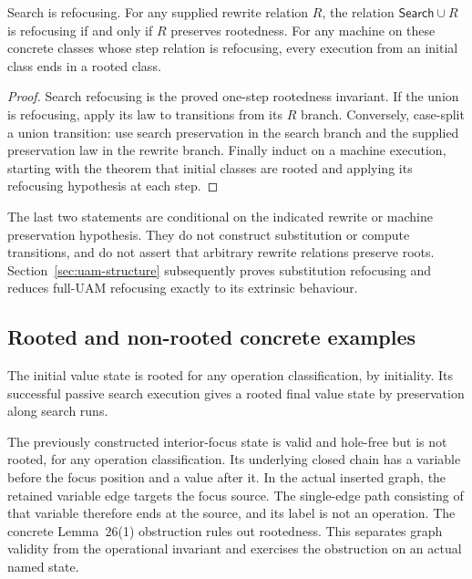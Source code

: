 \begin{theorem}
Search is refocusing. For any supplied rewrite relation $R$, the relation
$\mathsf{Search}\cup R$ is refocusing if and only if $R$ preserves rootedness.
For any machine on these concrete classes whose step relation is refocusing,
every execution from an initial class ends in a rooted class.
\end{theorem}
\begin{proof}
Search refocusing is the proved one-step rootedness invariant. If the union
is refocusing, apply its law to transitions from its $R$ branch. Conversely,
case-split a union transition: use search preservation in the search branch
and the supplied preservation law in the rewrite branch. Finally induct on
a machine execution, starting with the theorem that initial classes are rooted
and applying its refocusing hypothesis at each step.
\end{proof}
The last two statements are conditional on the indicated rewrite or machine
preservation hypothesis. They do not construct substitution or compute
transitions, and do not assert that arbitrary rewrite relations preserve roots.
Section~\ref{sec:uam-structure} subsequently proves substitution refocusing
and reduces full-UAM refocusing exactly to its extrinsic behaviour.

\subsection{Rooted and non-rooted concrete examples}
The initial value state is rooted for any operation classification, by initiality.
Its successful passive search execution gives a rooted final value state by
preservation along search runs.

The previously constructed interior-focus state is valid and hole-free but
is not rooted, for any operation classification. Its underlying closed chain
has a variable before the focus position and a value after it. In the actual
inserted graph, the retained variable edge targets the focus source. The
single-edge path consisting of that variable therefore ends at the source,
and its label is not an operation. The concrete Lemma~26(1) obstruction rules
out rootedness. This separates graph validity from the operational invariant
and exercises the obstruction on an actual named state.
